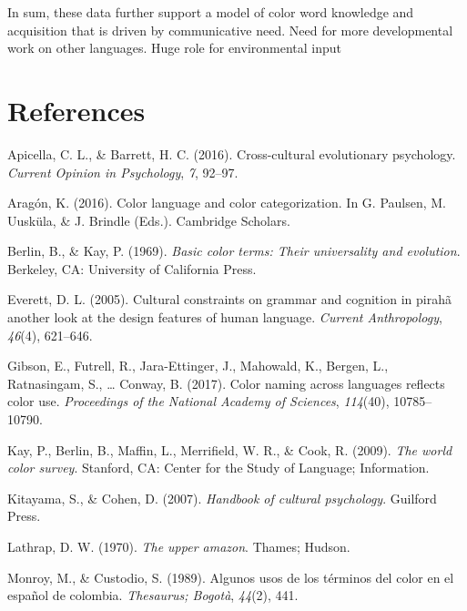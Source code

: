 \documentclass[
  english,
  ,man,floatsintext]{apa6}
\begin{document}
In sum, these data further support a model of color word knowledge and acquisition that is driven by communicative need.
Need for more developmental work on other languages.
Huge role for environmental input

\newpage

\hypertarget{references}{%
\section{References}\label{references}}

\begingroup
\setlength{\parindent}{-0.5in}
\setlength{\leftskip}{0.5in}

\hypertarget{refs}{}
\leavevmode\hypertarget{ref-apicella2016}{}%
Apicella, C. L., \& Barrett, H. C. (2016). Cross-cultural evolutionary psychology. \emph{Current Opinion in Psychology}, \emph{7}, 92--97.

\leavevmode\hypertarget{ref-aragon2016}{}%
Aragón, K. (2016). Color language and color categorization. In G. Paulsen, M. Uusküla, \& J. Brindle (Eds.). Cambridge Scholars.

\leavevmode\hypertarget{ref-berlin1969}{}%
Berlin, B., \& Kay, P. (1969). \emph{Basic color terms: Their universality and evolution}. Berkeley, CA: University of California Press.

\leavevmode\hypertarget{ref-everett2005}{}%
Everett, D. L. (2005). Cultural constraints on grammar and cognition in pirahã another look at the design features of human language. \emph{Current Anthropology}, \emph{46}(4), 621--646.

\leavevmode\hypertarget{ref-gibson2017}{}%
Gibson, E., Futrell, R., Jara-Ettinger, J., Mahowald, K., Bergen, L., Ratnasingam, S., \ldots{} Conway, B. (2017). Color naming across languages reflects color use. \emph{Proceedings of the National Academy of Sciences}, \emph{114}(40), 10785--10790.

\leavevmode\hypertarget{ref-berlin2009}{}%
Kay, P., Berlin, B., Maffin, L., Merrifield, W. R., \& Cook, R. (2009). \emph{The world color survey}. Stanford, CA: Center for the Study of Language; Information.

\leavevmode\hypertarget{ref-kitayama2007}{}%
Kitayama, S., \& Cohen, D. (2007). \emph{Handbook of cultural psychology}. Guilford Press.

\leavevmode\hypertarget{ref-lathrap1970}{}%
Lathrap, D. W. (1970). \emph{The upper amazon}. Thames; Hudson.

\leavevmode\hypertarget{ref-monroy1989}{}%
Monroy, M., \& Custodio, S. (1989). Algunos usos de los términos del color en el español de colombia. \emph{Thesaurus; Bogotà}, \emph{44}(2), 441.
\end{document}
